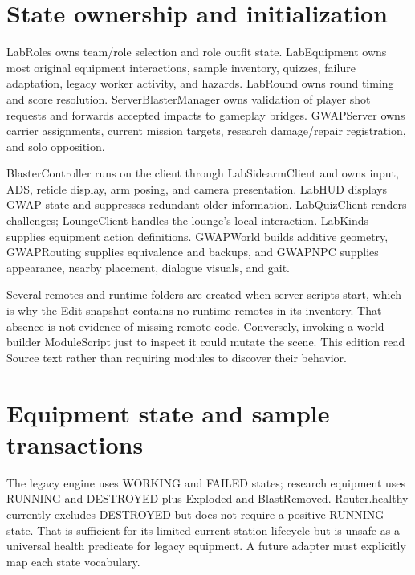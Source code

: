 \section{State ownership and initialization}
LabRoles owns team/\allowbreak{}role selection and role outfit state.\allowbreak{} LabEquipment owns most original equipment interactions, sample inventory, quizzes, failure adaptation, legacy worker activity, and hazards.\allowbreak{} LabRound owns round timing and score resolution.\allowbreak{} ServerBlasterManager owns validation of player shot requests and forwards accepted impacts to gameplay bridges.\allowbreak{} GWAPServer owns carrier assignments, current mission targets, research damage/\allowbreak{}repair registration, and solo opposition.\allowbreak{}

BlasterController runs on the client through LabSidearmClient and owns input, ADS, reticle display, arm posing, and camera presentation.\allowbreak{} LabHUD displays GWAP state and suppresses redundant older information.\allowbreak{} LabQuizClient renders challenges; LoungeClient handles the lounge's local interaction.\allowbreak{} LabKinds supplies equipment action definitions.\allowbreak{} GWAPWorld builds additive geometry, GWAPRouting supplies equivalence and backups, and GWAPNPC supplies appearance, nearby placement, dialogue visuals, and gait.\allowbreak{}

Several remotes and runtime folders are created when server scripts start, which is why the Edit snapshot contains no runtime remotes in its inventory.\allowbreak{} That absence is not evidence of missing remote code.\allowbreak{} Conversely, invoking a world-builder ModuleScript just to inspect it could mutate the scene.\allowbreak{} This edition read Source text rather than requiring modules to discover their behavior.\allowbreak{}

\section{Equipment state and sample transactions}
The legacy engine uses WORKING and FAILED states; research equipment uses RUNNING and DESTROYED plus Exploded and BlastRemoved.\allowbreak{} Router.\allowbreak{}healthy currently excludes DESTROYED but does not require a positive RUNNING state.\allowbreak{} That is sufficient for its limited current station lifecycle but is unsafe as a universal health predicate for legacy equipment.\allowbreak{} A future adapter must explicitly map each state vocabulary.\allowbreak{}

